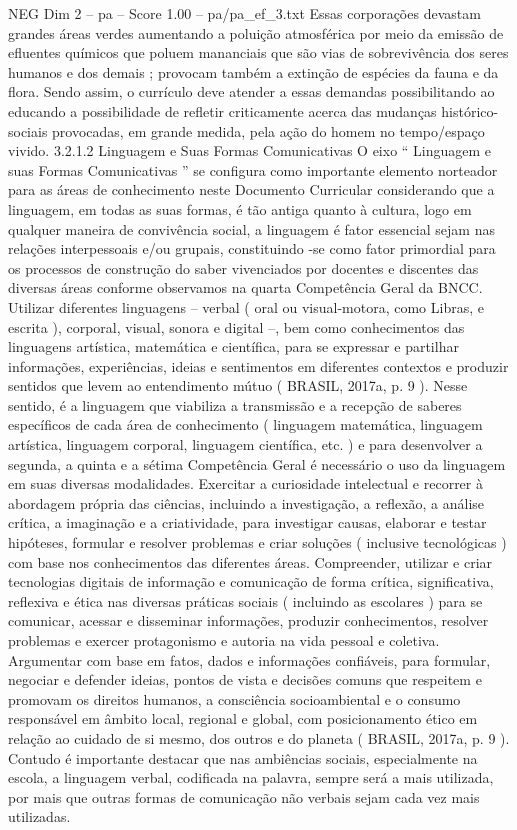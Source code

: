 \begin{textsample}{NEG Dim 2 – pa – Score 1.00 – pa/pa\_ef\_3.txt}
Essas corporações devastam grandes áreas verdes aumentando a poluição atmosférica por meio da emissão de efluentes químicos que poluem mananciais que são vias de sobrevivência dos seres humanos e dos demais ; provocam também a extinção de espécies da fauna e da flora.
Sendo assim, o currículo deve atender a essas demandas possibilitando ao educando a possibilidade de refletir criticamente acerca das mudanças histórico-sociais provocadas, em grande medida, pela ação do homem no tempo/espaço vivido. 3.2.1.2 Linguagem e Suas Formas Comunicativas O eixo “ Linguagem e suas Formas Comunicativas ” se configura como importante elemento norteador para as áreas de conhecimento neste Documento Curricular considerando que a linguagem, em todas as suas formas, é tão antiga quanto à cultura, logo em qualquer maneira de convivência social, a linguagem é fator essencial sejam nas relações interpessoais e/ou grupais, constituindo -se como fator primordial para os processos de construção do saber vivenciados por docentes e discentes das diversas áreas conforme observamos na quarta Competência Geral da BNCC.
Utilizar diferentes linguagens – verbal ( oral ou visual-motora, como Libras, e escrita ), corporal, visual, sonora e digital –, bem como conhecimentos das linguagens artística, matemática e científica, para se expressar e partilhar informações, experiências, ideias e sentimentos em diferentes contextos e produzir sentidos que levem ao entendimento mútuo ( BRASIL, 2017a, p. 9 ).
Nesse sentido, é a linguagem que viabiliza a transmissão e a recepção de saberes específicos de cada área de conhecimento ( linguagem matemática, linguagem artística, linguagem corporal, linguagem científica, etc. ) e para desenvolver a segunda, a quinta e a sétima Competência Geral é necessário o uso da linguagem em suas diversas modalidades.
Exercitar a curiosidade intelectual e recorrer à abordagem própria das ciências, incluindo a investigação, a reflexão, a análise crítica, a imaginação e a criatividade, para investigar causas, elaborar e testar hipóteses, formular e resolver problemas e criar soluções ( inclusive tecnológicas ) com base nos conhecimentos das diferentes áreas.
Compreender, utilizar e criar tecnologias digitais de informação e comunicação de forma crítica, significativa, reflexiva e ética nas diversas práticas sociais ( incluindo as escolares ) para se comunicar, acessar e disseminar informações, produzir conhecimentos, resolver problemas e exercer protagonismo e autoria na vida pessoal e coletiva.
Argumentar com base em fatos, dados e informações confiáveis, para formular, negociar e defender ideias, pontos de vista e decisões comuns que respeitem e promovam os direitos humanos, a consciência socioambiental e o consumo responsável em âmbito local, regional e global, com posicionamento ético em relação ao cuidado de si mesmo, dos outros e do planeta ( BRASIL, 2017a, p. 9 ).
Contudo é importante destacar que nas ambiências sociais, especialmente na escola, a linguagem verbal, codificada na palavra, sempre será a mais utilizada, por mais que outras formas de comunicação não verbais sejam cada vez mais utilizadas.

\end{textsample}

